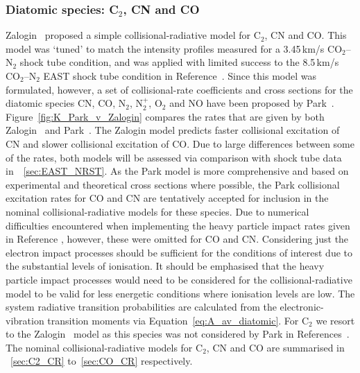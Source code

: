 \subsubsection{Diatomic species: C$_2$, CN and CO}

Zalogin~\cite{zalogin_2001} proposed a simple collisional-radiative model for C$_2$, CN and CO.
This model was `tuned' to match the intensity profiles measured for a 3.45\,km/s CO$_2$--N$_2$ shock tube condition, and was applied with limited success to the 8.5\,km/s CO$_2$--N$_2$ EAST shock tube condition in Reference~\cite{potter_2008c}.
Since this model was formulated, however, a set of collisional-rate coefficients and cross sections for the diatomic species CN, CO, N$_2$, N$_2^+$, O$_2$ and NO have been proposed by Park~\cite{park2008a, park2008b}.
Figure~\ref{fig:K_Park_v_Zalogin} compares the rates that are given by both Zalogin~\cite{zalogin_2001} and Park~\cite{park2008a, park2008b}.
The Zalogin model predicts faster collisional excitation of CN and slower collisional excitation of CO.
Due to large differences between some of the rates, both models will be assessed via comparison with shock tube data in~\textsection~\ref{sec:EAST_NRST}.
As the Park model is more comprehensive and based on experimental and theoretical cross sections where possible, the Park collisional excitation rates for CO and CN are tentatively accepted for inclusion in the nominal collisional-radiative models for these species.
Due to numerical difficulties encountered when implementing the heavy particle impact rates given in Reference \cite{park2008b}, however, these were omitted for CO and CN.
Considering just the electron impact processes should be sufficient for the conditions of interest due to the substantial levels of ionisation.
It should be emphasised that the heavy particle impact processes would need to be considered for the collisional-radiative model to be valid for less energetic conditions where ionisation levels are low.
The system radiative transition probabilities are calculated from the electronic-vibration transition moments via Equation~\ref{eq:A_av_diatomic}.
For C$_2$ we resort to the Zalogin~\cite{zalogin_2001} model as this species was not considered by Park in References~\cite{park2008a, park2008b}.
The nominal collisional-radiative models for C$_2$, CN and CO are summarised in \textsection~\ref{sec:C2_CR} to~\ref{sec:CO_CR} respectively.


